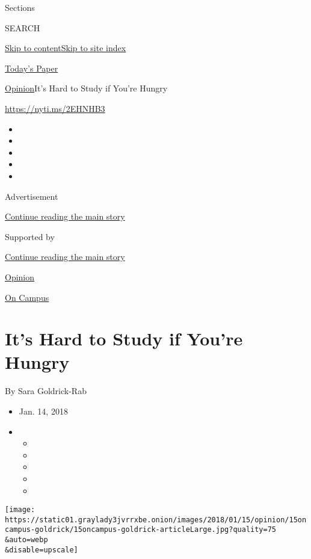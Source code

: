 Sections

SEARCH

\protect\hyperlink{site-content}{Skip to
content}\protect\hyperlink{site-index}{Skip to site index}

\href{https://myaccount.nytimes3xbfgragh.onion/auth/login?response_type=cookie\&client_id=vi}{}

\href{https://www.nytimes3xbfgragh.onion/section/todayspaper}{Today's
Paper}

\href{/section/opinion}{Opinion}\textbar{}It's Hard to Study if You're
Hungry

\url{https://nyti.ms/2EHNHB3}

\begin{itemize}
\item
\item
\item
\item
\item
\end{itemize}

Advertisement

\protect\hyperlink{after-top}{Continue reading the main story}

Supported by

\protect\hyperlink{after-sponsor}{Continue reading the main story}

\href{/section/opinion}{Opinion}

\href{/column/on-campus}{On Campus}

\hypertarget{its-hard-to-study-if-youre-hungry}{%
\section{It's Hard to Study if You're
Hungry}\label{its-hard-to-study-if-youre-hungry}}

By Sara Goldrick-Rab

\begin{itemize}
\item
  Jan. 14, 2018
\item
  \begin{itemize}
  \item
  \item
  \item
  \item
  \item
  \end{itemize}
\end{itemize}

\texttt{[image: https://static01.graylady3jvrrxbe.onion/images/2018/01/15/opinion/15oncampus-goldrick/15oncampus-goldrick-articleLarge.jpg?quality=75\\\&auto=webp\\\&disable=upscale]}

